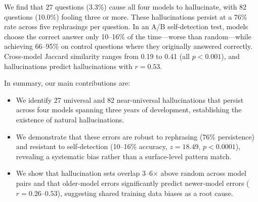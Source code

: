 We find that 27 questions (3.3\%) cause all four models to hallucinate, with 82 questions (10.0\%) fooling three or more.
These hallucinations persist at a 76\% rate across five rephrasings per question.
In an A/B self-detection test, models choose the correct answer only 10--16\% of the time---worse than random---while achieving 66--95\% on control questions where they originally answered correctly.
Cross-model Jaccard similarity ranges from 0.19 to 0.41 (all $p < 0.001$), and \gptfouromini hallucinations predict \gptfouro hallucinations with $r = 0.53$.

In summary, our main contributions are:
\begin{itemize}[leftmargin=*,itemsep=0pt,topsep=0pt]
    \item We identify 27 universal and 82 near-universal hallucinations that persist across four models spanning three years of development, establishing the existence of natural hallucinations.
    \item We demonstrate that these errors are robust to rephrasing (76\% persistence) and resistant to self-detection (10--16\% accuracy, $z = 18.49$, $p < 0.0001$), revealing a systematic bias rather than a surface-level pattern match.
    \item We show that hallucination sets overlap 3--6$\times$ above random across model pairs and that older-model errors significantly predict newer-model errors ($r = 0.26$--$0.53$), suggesting shared training data biases as a root cause.
\end{itemize}
